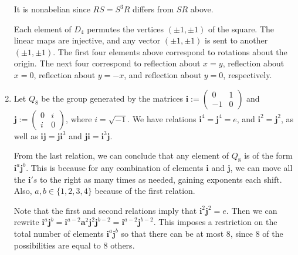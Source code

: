 \documentclass[11pt, reqno]{article}
\begin{document}
\begin{enumerate}
    It is nonabelian since $RS = S^3R$ differs from $SR$ above.

    Each element of $D_4$ permutes the vertices $(\pm 1, \pm 1)$ of the square. The linear maps are injective,
    and any vector $(\pm 1, \pm 1)$ is sent to another $(\pm 1, \pm 1)$. The first four elements above correspond to 
    rotations about the origin. The next four correspond to reflection about $x = y$, reflection about $x = 0$,
    reflection about $y = -x$, and reflection about $y = 0$, respectively.

    \item Let $Q_8$ be the group generated by the matrices $\textbf{i} := \left(\begin{smallmatrix}0 & 1 \\ -1 & 0\end{smallmatrix}\right)$
    and $\textbf{j} := \left(\begin{smallmatrix} 0 & i \\ i & 0\end{smallmatrix}\right)$, where $i = \sqrt{-1}$. We have relations $\textbf{i}^4 = 
    \textbf{j}^4 = e$, and $\textbf{i}^2 = \textbf{j}^2$, as well as $\textbf{ij} = \textbf{j}\textbf{i}^3$
    and $\textbf{ji} = \textbf{i}^3\textbf{j}$.

    From the last relation, we can conclude that any element of $Q_8$ is of the form $\textbf{i}^a \textbf{j}^b$. This
    is because for any combination of elements $\textbf{i}$ and $\textbf{j}$, we can move all the $\textbf{i}'s$ to the right 
    as many times as needed, gaining exponents each shift. Also, $a,b \in \{1, 2, 3, 4\}$ because of the first relation. 

    Note that the first and second relations imply that $\textbf{i}^2\textbf{j}^2 = e$.
    Then we can rewrite $\textbf{i}^a\textbf{j}^b = \textbf{i}^{a-2}\textbf{a}^2\textbf{j}^2\textbf{j}^{b-2} = 
    \textbf{i}^{a-2}\textbf{j}^{b-2}$. This imposes a restriction on the total number of elements $\textbf{i}^a\textbf{j}^b$
    so that there can be at most $8$, since $8$ of the possibilities are equal to $8$ others. 


\end{enumerate}
\end{document}
